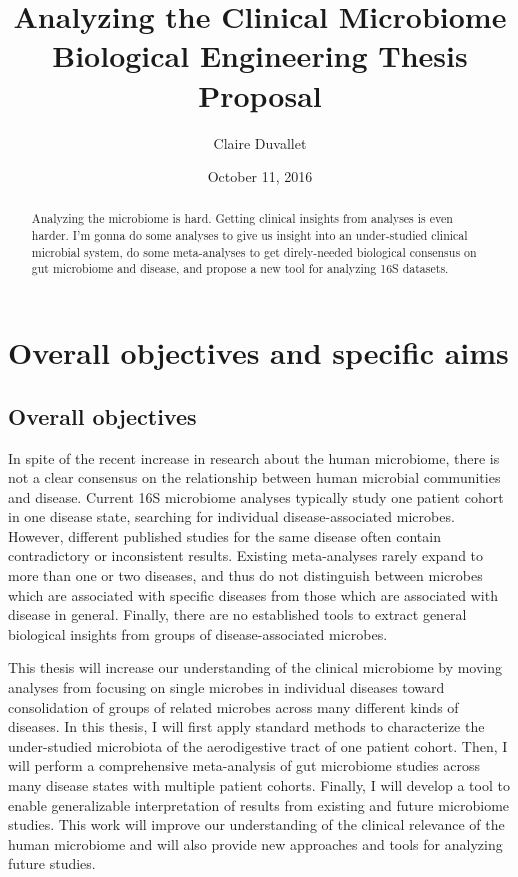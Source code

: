 \documentclass[12pt]{article}
\title{Analyzing the Clinical Microbiome \\ Biological Engineering Thesis Proposal}
\author{Claire Duvallet}
\date{October 11, 2016}
\begin{document}
\maketitle
\newpage
\tableofcontents

\begin{abstract}
Analyzing the microbiome is hard. Getting clinical insights from analyses is even harder. I'm gonna do some analyses to give us insight into an under-studied clinical microbial system, do some meta-analyses to get direly-needed biological consensus on gut microbiome and disease, and propose a new tool for analyzing 16S datasets.
\end{abstract}
\newpage

\section{Overall objectives and specific aims}
\subsection{Overall objectives}

In spite of the recent increase in research about the human microbiome, there is not a clear consensus on the relationship between human microbial communities and disease. Current 16S microbiome analyses typically study one patient cohort in one disease state, searching for individual disease-associated microbes. However, different published studies for the same disease often contain contradictory or inconsistent results. Existing meta-analyses rarely expand to more than one or two diseases, and thus do not distinguish between microbes which are associated with specific diseases from those which are associated with disease in general. Finally, there are no established tools to extract general biological insights from groups of disease-associated microbes.

This thesis will increase our understanding of the clinical microbiome by moving analyses from focusing on single microbes in individual diseases toward consolidation of groups of related microbes across many different kinds of diseases. In this thesis, I will first apply standard methods to characterize the under-studied microbiota of the aerodigestive tract of one patient cohort. Then, I will perform a comprehensive meta-analysis of gut microbiome studies across many disease states with multiple patient cohorts. Finally, I will develop a tool to enable generalizable interpretation of results from existing and future microbiome studies. This work will improve our understanding of the clinical relevance of the human microbiome and will also provide new approaches and tools for analyzing future studies.
\end{document}
